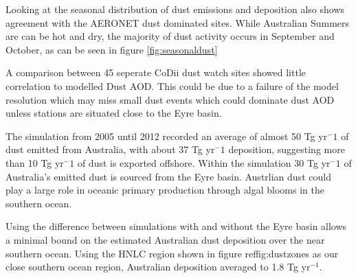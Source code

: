 
Looking at the seasonal distribution of dust emissions and deposition also shows agreement with the AERONET dust dominated sites.
While Australian Summers are can be hot and dry, the majority of dust activity occurs in September and October, as can be seen in figure \ref{fig:seasonaldust}

A comparison between 45 seperate CoDii dust watch sites showed little correlation to modelled Dust AOD.
This could be due to a failure of the model resolution which may miss small dust events which could dominate dust AOD unless stations are situated close to the Eyre basin.

The simulation from 2005 until 2012 recorded an average of almost 50 Tg yr$^-1$ of dust emitted from Australia, with about 37 Tg yr$^-1$ deposition, suggesting more than 10 Tg yr$^-1$ of dust is exported offshore.
Within the simulation 30 Tg yr$^-1$ of Australia's emitted dust is sourced from the Eyre basin.
Austrlian dust could play a large role in oceanic primary production through algal blooms in the southern ocean.

Using the difference between simulations with and without the Eyre basin allows a minimal bound on the estimated Australian dust deposition over the near southern ocean.
Using the HNLC region shown in figure ref{fig:dustzones} as our close southern ocean region, Australian deposition averaged to 1.8 Tg yr$^{-1}$.